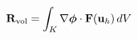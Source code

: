 \documentclass[preview]{standalone}
\begin{document}
\begin{align*}
\special{dvisvgm:raw <g id='unique000'>}\mathbf{R}_{\text{vol}} = \int_K \nabla\boldsymbol{\phi}\cdot \mathbf{F}(\mathbf{u}_h)\, dV\special{dvisvgm:raw </g>}
\end{align*}
\end{document}
